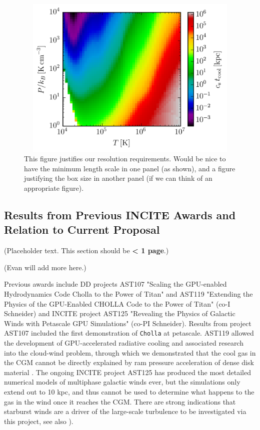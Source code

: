 \documentclass[11pt,letterpaper,english]{article}
\begin{document}
\begin{figure}[h]
\centering
\includegraphics[width=4.52in, height=3.08in, keepaspectratio=true]{cs_tcool_P_T_3.png}
\caption{This figure justifies our resolution requirements. Would be nice to have the minimum length scale in one panel (as shown), and a figure justifying the box size in another panel (if we can think of an appropriate figure).}
\label{Fig1}
\end{figure}

\vspace{-.25in}
\subsection{Results from Previous INCITE Awards and Relation to Current Proposal}
\vspace{-.2in}

(Placeholder text. This section should be {\bf < 1 page}.)

(Evan will add more here.)

Previous awards include DD projects AST107 "Scaling the GPU-enabled Hydrodynamics Code Cholla to the Power of Titan" and AST119 "Extending the Physics of the GPU-Enabled CHOLLA Code to the Power of Titan" (co-I Schneider) and INCITE project AST125 "Revealing the Physics of Galactic Winds with Petascale GPU Simulations" (co-PI Schneider). Results from project AST107 included the first demonstration of {\tt Cholla} at petascale. AST119 allowed the development of GPU-accelerated radiative cooling and associated research into the cloud-wind problem, through which we demonstrated that the cool gas in the CGM cannot be directly explained by ram pressure acceleration of dense disk material \cite{Schneider17}. The ongoing INCITE project AST125 has produced the most detailed numerical models of multiphase galactic winds ever, but the simulations only extend out to 10 kpc, and thus cannot be used to determine what happens to the gas in the wind once it reaches the CGM. There are strong indications that starburst winds are a driver of the large-scale turbulence to be investigated via this project, see also \cite{Fielding17}).
\end{document}
